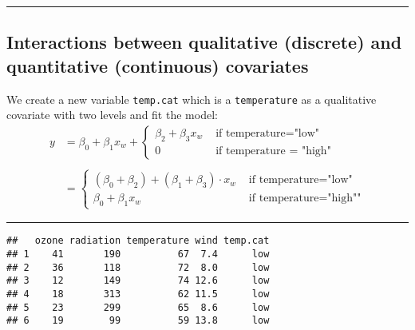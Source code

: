 \documentclass[]{article}
\newenvironment{Shaded}{\begin{snugshade}}{\end{snugshade}}
\newcommand{\KeywordTok}[1]{\textcolor[rgb]{0.13,0.29,0.53}{\textbf{#1}}}
\newcommand{\NormalTok}[1]{#1}
\newcommand{\OperatorTok}[1]{\textcolor[rgb]{0.81,0.36,0.00}{\textbf{#1}}}
\newcommand{\StringTok}[1]{\textcolor[rgb]{0.31,0.60,0.02}{#1}}
\begin{document}
\begin{center}\rule{0.5\linewidth}{\linethickness}\end{center}

\hypertarget{interactions-between-qualitative-discrete-and-quantitative-continuous-covariates}{%
\subsection{Interactions between qualitative (discrete) and quantitative
(continuous)
covariates}\label{interactions-between-qualitative-discrete-and-quantitative-continuous-covariates}}

We create a new variable \texttt{temp.cat} which is a
\texttt{temperature} as a qualitative covariate with two levels and fit
the model:
\[\begin{aligned}y&=\beta_0 + \beta_1 x_w + \begin{cases} \beta_2 + \beta_3  x_w  &\text{ if temperature="low"}\\ 0 &\text{ if temperature = "high"}\end{cases} \\\\ &= \begin{cases} (\beta_0 + \beta_2) + (\beta_1 + \beta_3) \cdot x_w &\text{ if temperature="low"}\\ \beta_0 + \beta_1 x_w &\text{ if temperature="high""} \end{cases} \end{aligned}\]

\begin{center}\rule{0.5\linewidth}{\linethickness}\end{center}

\footnotesize

\begin{Shaded}
\end{Shaded}

\begin{verbatim}
##   ozone radiation temperature wind temp.cat
## 1    41       190          67  7.4      low
## 2    36       118          72  8.0      low
## 3    12       149          74 12.6      low
## 4    18       313          62 11.5      low
## 5    23       299          65  8.6      low
## 6    19        99          59 13.8      low
\end{verbatim}
\end{document}
